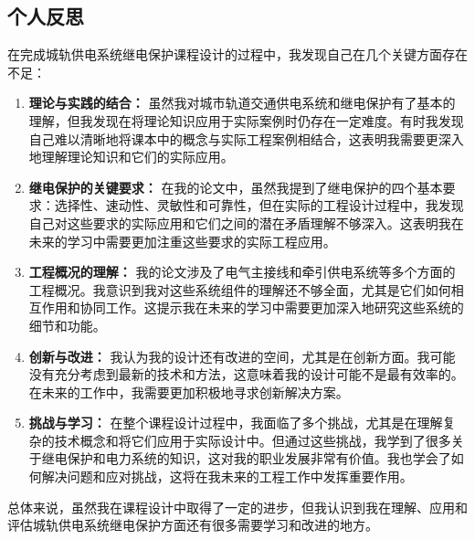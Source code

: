 \begin{enumerate}
\section{个人反思}

在完成城轨供电系统继电保护课程设计的过程中，我发现自己在几个关键方面存在不足：

\begin{enumerate}
	\item \textbf{理论与实践的结合：} 虽然我对城市轨道交通供电系统和继电保护有了基本的理解，但我发现在将理论知识应用于实际案例时仍存在一定难度。有时我发现自己难以清晰地将课本中的概念与实际工程案例相结合，这表明我需要更深入地理解理论知识和它们的实际应用。
	
	\item \textbf{继电保护的关键要求：} 在我的论文中，虽然我提到了继电保护的四个基本要求：选择性、速动性、灵敏性和可靠性，但在实际的工程设计过程中，我发现自己对这些要求的实际应用和它们之间的潜在矛盾理解不够深入。这表明我在未来的学习中需要更加注重这些要求的实际工程应用。
	
	\item \textbf{工程概况的理解：} 我的论文涉及了电气主接线和牵引供电系统等多个方面的工程概况。我意识到我对这些系统组件的理解还不够全面，尤其是它们如何相互作用和协同工作。这提示我在未来的学习中需要更加深入地研究这些系统的细节和功能。
	
	\item \textbf{创新与改进：} 我认为我的设计还有改进的空间，尤其是在创新方面。我可能没有充分考虑到最新的技术和方法，这意味着我的设计可能不是最有效率的。在未来的工作中，我需要更加积极地寻求创新解决方案。
	
	\item \textbf{挑战与学习：} 在整个课程设计过程中，我面临了多个挑战，尤其是在理解复杂的技术概念和将它们应用于实际设计中。但通过这些挑战，我学到了很多关于继电保护和电力系统的知识，这对我的职业发展非常有价值。我也学会了如何解决问题和应对挑战，这将在我未来的工程工作中发挥重要作用。
\end{enumerate}

总体来说，虽然我在课程设计中取得了一定的进步，但我认识到我在理解、应用和评估城轨供电系统继电保护方面还有很多需要学习和改进的地方。

\end{enumerate}
